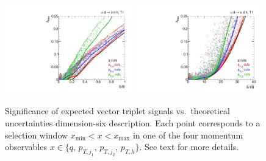 \begin{figure}
  \includegraphics[width=0.49\textwidth]{fig/validity/WBF_cuts_T1_SB.pdf}%
  \includegraphics[width=0.49\textwidth]{fig/validity/WBF_cuts_T1_SsqrtB.pdf}%
  \caption{Significance of expected vector triplet signals vs.\
    theoretical uncertainties dimension-six description. Each point
    corresponds to a selection window
    $x_\text{min} < x < x_\text{max}$ in one of the four momentum
    observables
    $x \in \{ q, \, p_{T,j_1}, \, p_{T,j_2}, \, p_{T,h} \}$. See text
    for more details.}
  \label{fig:validity_cuts}
\end{figure}

